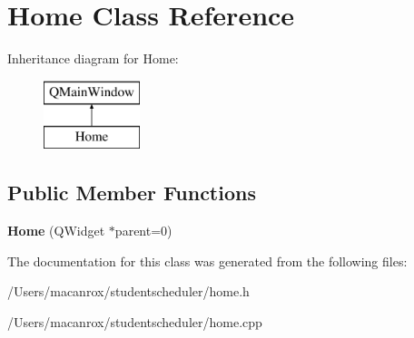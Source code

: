 \hypertarget{class_home}{\section{Home Class Reference}
\label{class_home}
}
Inheritance diagram for Home\-:\begin{figure}[H]
\begin{center}
\leavevmode
\includegraphics[height=2.000000cm]{class_home}
\end{center}
\end{figure}
\subsection*{Public Member Functions}
\begin{DoxyCompactItemize}
\item 
\hypertarget{class_home_aeedf0ef0f57ed0b071106f3db10813df}{{\bfseries Home} (Q\-Widget $\ast$parent=0)}\label{class_home_aeedf0ef0f57ed0b071106f3db10813df}

\end{DoxyCompactItemize}


The documentation for this class was generated from the following files\-:\begin{DoxyCompactItemize}
\item 
/\-Users/macanrox/studentscheduler/home.\-h\item 
/\-Users/macanrox/studentscheduler/home.\-cpp\end{DoxyCompactItemize}
